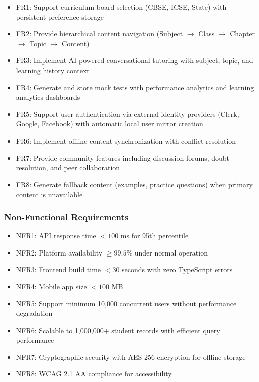 \documentclass[10pt,conference,compsocconf]{IEEEtran}
\begin{document}
\begin{itemize}
    \item FR1: Support curriculum board selection (CBSE, ICSE, State) with persistent preference storage
    \item FR2: Provide hierarchical content navigation (Subject $\rightarrow$ Class $\rightarrow$ Chapter $\rightarrow$ Topic $\rightarrow$ Content)
    \item FR3: Implement AI-powered conversational tutoring with subject, topic, and learning history context
    \item FR4: Generate and store mock tests with performance analytics and learning analytics dashboards
    \item FR5: Support user authentication via external identity providers (Clerk, Google, Facebook) with automatic local user mirror creation
    \item FR6: Implement offline content synchronization with conflict resolution
    \item FR7: Provide community features including discussion forums, doubt resolution, and peer collaboration
    \item FR8: Generate fallback content (examples, practice questions) when primary content is unavailable
\end{itemize}

\subsubsection{Non-Functional Requirements}

\begin{itemize}
    \item NFR1: API response time $< 100$ ms for 95th percentile
    \item NFR2: Platform availability $\geq 99.5\%$ under normal operation
    \item NFR3: Frontend build time $< 30$ seconds with zero TypeScript errors
    \item NFR4: Mobile app size $< 100$ MB
    \item NFR5: Support minimum 10,000 concurrent users without performance degradation
    \item NFR6: Scalable to 1,000,000+ student records with efficient query performance
    \item NFR7: Cryptographic security with AES-256 encryption for offline storage
    \item NFR8: WCAG 2.1 AA compliance for accessibility
\end{itemize}
\end{document}
